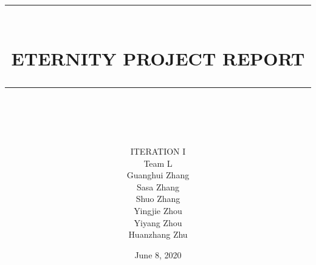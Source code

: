\documentclass[12pt]{article}
\newcommand{\HRule}[1]{\rule{\linewidth}{#1}}
\begin{document}
\title{ \normalsize \textsc{}
		\\ [2.0cm]
		\HRule{0.5pt} \\
		\LARGE \textbf{\uppercase{Eternity Project Report}}
		\HRule{2pt} \\ [0.5cm]
		\normalsize  \vspace*{5\baselineskip}}


\date{June 8, 2020}

\author{
        \vspace{1.5cm}
       \LARGE ITERATION I \\
        \vspace{0.5cm}
        \LARGE Team L\\


		Guanghui Zhang\\
        Sasa Zhang\\
        Shuo Zhang\\
        Yingjie Zhou\\
        Yiyang Zhou\\
        Huanzhang Zhu\\
 }

\maketitle


\newpage

\tableofcontents
\newpage
\end{document}
